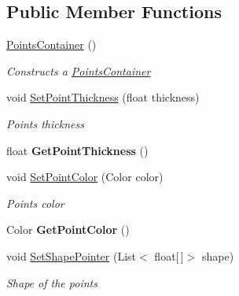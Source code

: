 \subsection*{Public Member Functions}
\begin{DoxyCompactItemize}
\item 
\mbox{\hyperlink{class_space_v_i_l_1_1_points_container_ac769a83ca0591540c776169c376446a3}{Points\+Container}} ()
\begin{DoxyCompactList}\small\item\em Constructs a \mbox{\hyperlink{class_space_v_i_l_1_1_points_container}{Points\+Container}} \end{DoxyCompactList}\item 
void \mbox{\hyperlink{class_space_v_i_l_1_1_points_container_a0926aa9cf438fe742d4b7ad6c5cdcd7d}{Set\+Point\+Thickness}} (float thickness)
\begin{DoxyCompactList}\small\item\em Points thickness \end{DoxyCompactList}\item 
\mbox{\label{class_space_v_i_l_1_1_points_container_a289a6eb2df75c9a2c02dc69b3cbcfaf0}} 
float {\bfseries Get\+Point\+Thickness} ()
\item 
void \mbox{\hyperlink{class_space_v_i_l_1_1_points_container_a35182a540471d4cd742ad2b484cd8769}{Set\+Point\+Color}} (Color color)
\begin{DoxyCompactList}\small\item\em Points color \end{DoxyCompactList}\item 
\mbox{\label{class_space_v_i_l_1_1_points_container_aa0a2d535d8044c729aff9622b2457be4}} 
Color {\bfseries Get\+Point\+Color} ()
\item 
void \mbox{\hyperlink{class_space_v_i_l_1_1_points_container_a0694fefae0c13a4006608adc71c9f706}{Set\+Shape\+Pointer}} (List$<$ float\mbox{[}$\,$\mbox{]}$>$ shape)
\begin{DoxyCompactList}\small\item\em Shape of the points \end{DoxyCompactList}\item 
\mbox{\label{class_space_v_i_l_1_1_points_container_a34976d6b46131e939358bcbffbce7d96}} 

\end{DoxyCompactItemize}
